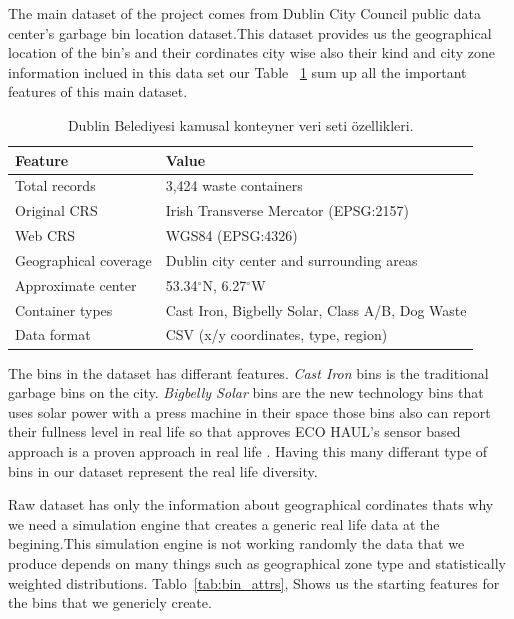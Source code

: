 \documentclass[12pt,a4paper]{report}
\begin{document}
\indent The main dataset of the project comes from Dublin City Council public data center's garbage bin location dataset.This dataset provides  us the geographical location of the bin's and their cordinates city wise also their kind and city zone information inclued in this data set our Table ~\ref{tab:dataset} sum up all the important features of this main dataset.

\begin{table}[H]
\centering
\caption{Dublin Belediyesi kamusal konteyner veri seti özellikleri.}
\label{tab:dataset}
\begin{tabular}{ll}
\toprule
\textbf{Feature} & \textbf{Value} \\
\midrule
Total records        & 3,424 waste containers \\
Original CRS         & Irish Transverse Mercator (EPSG:2157) \\
Web CRS              & WGS84 (EPSG:4326) \\
Geographical coverage & Dublin city center and surrounding areas \\
Approximate center   & 53.34$^\circ$N, 6.27$^\circ$W \\
Container types      & Cast Iron, Bigbelly Solar, Class A/B, Dog Waste \\
Data format          & CSV (x/y coordinates, type, region) \\
\bottomrule
\end{tabular}
\end{table}


\indent The bins in the dataset has differant features. \textit{Cast Iron} bins is the traditional garbage bins on the city. \textit{Bigbelly Solar} bins are the new technology bins that uses solar power with a press machine in their space those bins also can report their fullness level in real life so that approves ECO HAUL's sensor based approach is a proven approach in real life . Having this many differant type of bins in our dataset represent the real life  diversity.


\indent Raw dataset has only the information about geographical cordinates thats why we need a simulation engine that creates a generic real life data at the begining.This simulation engine is not working randomly the data that we produce depends on many things such as geographical zone type and statistically weighted distributions. Tablo~\ref{tab:bin_attrs}, Shows us the starting features for the bins that we genericly create.
\end{document}
